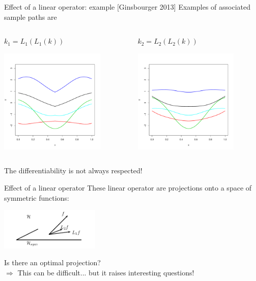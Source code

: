 \documentclass{beamer}
\begin{document}
\begin{frame}{Effect of a linear operator: example [Ginsbourger 2013]}
Examples of associated sample paths are 

\begin{columns}[c]
\begin{column}{5cm}
\begin{center}
 $k_1 = L_1(L_1(k))$
\end{center}
 \includegraphics[height=5cm]{figures/R/p2-sym1}
\end{column}
\begin{column}{5cm}
\begin{center}
 $k_2= L_2(L_2(k))$
\end{center}
 \includegraphics[height=5cm]{figures/R/p2-sym2}
\end{column}
\end{columns}
The differentiability is not always respected!
\end{frame}

\begin{frame}{Effect of a linear operator}
These linear operator are projections onto a space of symmetric functions:
\begin{center}
\vspace{0.5cm}
 \includegraphics[height=2cm]{figures/latexdraw/proj-sym}
\vspace{0.5cm}
\end{center}
Is there an optimal projection?\\
\vspace{0.5cm}
\alert{$\Rightarrow$ This can be difficult... but it raises interesting questions!}
\end{frame}
\end{document}
